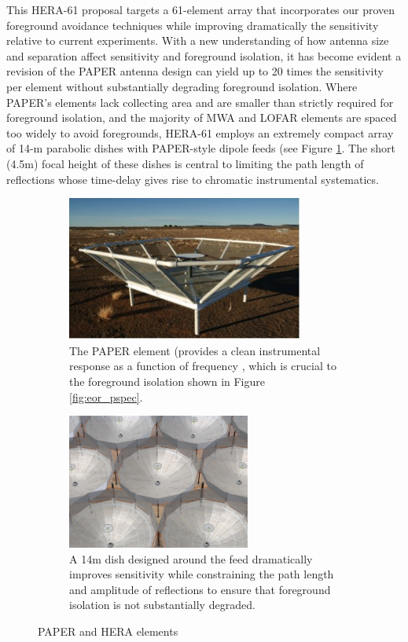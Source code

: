 \documentclass[preprint]{aastex}
\begin{document}
This HERA-61 proposal targets a 61-element array that incorporates
our proven foreground avoidance techniques while improving
dramatically the sensitivity relative to current experiments.  With a
new understanding of how antenna size and separation affect
sensitivity and foreground isolation, it has become evident a revision
of the PAPER antenna design can yield up to 20 times the sensitivity
per element without substantially degrading foreground isolation.
Where PAPER's elements lack collecting area and are smaller than
strictly required for foreground isolation, and the majority of MWA
and LOFAR elements are spaced too widely to avoid foregrounds,
HERA-61 employs an extremely compact array of 14-m parabolic dishes
with PAPER-style dipole feeds (see Figure \ref{fig:hera_dish}.  The
short (4.5m) focal height of these dishes is central to limiting the
path length of reflections whose time-delay gives rise to chromatic
instrumental systematics.

\begin{figure}[!ht]
\centering
	\begin{subfigure}[b]{0.46\textwidth}
		\includegraphics[width=\textwidth]{plots/paper_element.jpg}
		\caption{The PAPER element (provides a clean instrumental response as a function
		of frequency \citep{parsons_et_al2010,parsons_et_al2012b}, which is crucial to
		the foreground isolation shown in Figure \ref{fig:eor_pspec}.}
	\end{subfigure}
	\quad
	\begin{subfigure}[b]{0.46\textwidth}
		\includegraphics[height=1.75in]{plots/hera_dish.png}
		\caption{A 14m dish designed around the feed dramatically improves sensitivity while
		constraining the path length and amplitude of reflections to ensure that foreground 
		isolation is not substantially degraded.}
	\end{subfigure}
\caption{PAPER and HERA elements}
\label{fig:hera_dish}
\end{figure}
\end{document}
